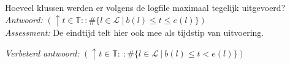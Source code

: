 
\item Hoeveel klussen werden er volgens de logfile maximaal tegelijk uitgevoerd? \\



\emph{Antwoord:} $(\uparrow t \in \mathbb{T} : : \#\{ l \in \mathcal{L} ~|~ b(l) \leq t \leq e(l) \})$ \\
\emph{Assessment:} De eindtijd telt hier ook mee als tijdstip van uitvoering.

\emph{Verbeterd antwoord:} $(\uparrow t \in \mathbb{T} :~: \#\{ l \in \mathcal{L} ~|~ b(l) \leq t < e(l) \})$ \\
